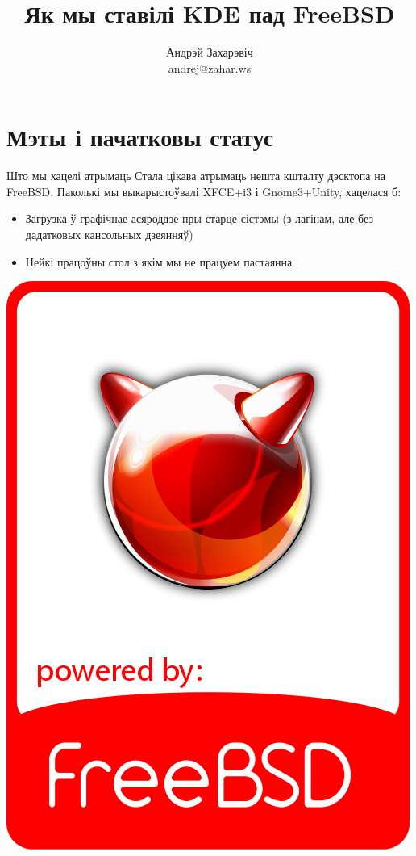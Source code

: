 \documentclass[ignorenonframetext,hyperref={pdftex,unicode}]{beamer}
\title{Як мы ставілі KDE пад FreeBSD} %
\author["Андрэй Захарэвіч"]{Андрэй Захарэвіч\\ andrej@zahar.ws} %
\begin{document}

\frame{\titlepage} %


\section{Мэты і пачатковы статус} %

\begin{frame}{Што мы хацелі атрымаць} %
	Стала цікава атрымаць нешта кшталту дэсктопа на FreeBSD. Паколькі мы выкарыстоўвалі XFCE+i3 і Gnome3+Unity, хацелася б:
	\begin{itemize}
		\item Загрузка ў графічнае асяроддзе пры старце сістэмы (з лагінам, але без дадатковых кансольных дзеянняў)
		\item Нейкі працоўны стол з якім мы не працуем пастаянна
	\end{itemize}
	\begin{center}
 		\includegraphics[height=0.5\textheight,keepaspectratio]{freebsd_badge} %
	\end{center}
\end{frame} %
\end{document}
